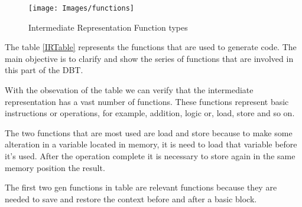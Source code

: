 \documentclass[11pt]{report}
\begin{document}
	\begin{figure} [H]
		\centering
		\texttt{[image: Images/functions]}
		\caption{Intermediate Representation Function types}
		\label{fig:genfunctions}
	\end{figure}
	
	The table \ref{IRTable} represents the functions that are used to generate code. The main objective is  to clarify and show the series of functions that are involved in this part of the DBT. 
	
	With the obsevation of the table we can verify that the intermediate representation has a vast number of functions. These functions represent basic instructions or operations, for example, addition, logic or, load, store and so on.
	
	The two functions that are most used are load and store because to make some alteration in a variable located in memory, it is need to load that variable before it's used. After the operation complete it is necessary to store again in the same memory position the result.
	
	The first two gen functions in table are relevant functions because they are needed to save and restore the context before and after a basic block.
	
\end{document}

